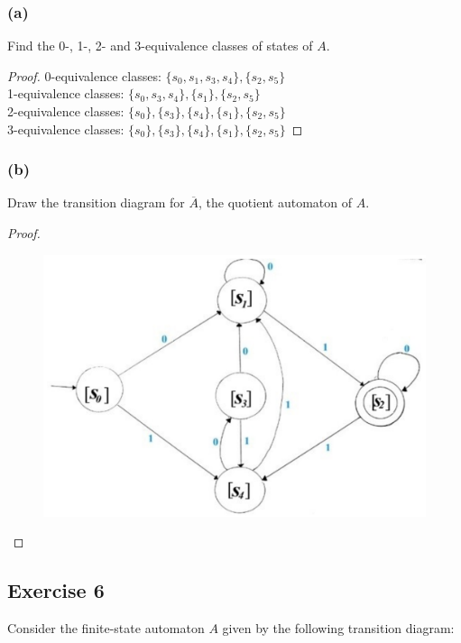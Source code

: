 \documentclass[14pt]{extarticle}
\begin{document}
\subsubsection{(a)}
Find the 0-, 1-, 2- and 3-equivalence classes of states of \(A\).

\begin{proof}
0-equivalence classes: \(\{s_0, s_1, s_3, s_4\}, \{s_2, s_5\}\) \\
1-equivalence classes: \(\{s_0, s_3, s_4\}, \{s_1\}, \{s_2, s_5\}\) \\
2-equivalence classes: \(\{s_0\}, \{s_3\}, \{s_4\}, \{s_1\}, \{s_2, s_5\}\) \\
3-equivalence classes: \(\{s_0\}, \{s_3\}, \{s_4\}, \{s_1\}, \{s_2, s_5\}\)
\end{proof}

\subsubsection{(b)}
Draw the transition diagram for \(\overline{A}\), the quotient automaton of \(A\).

\begin{proof}
\begin{figure}[ht!]
\centering
\includegraphics[scale=0.3]{../images/12.3.5.b.png}
\end{figure}
\end{proof}

\subsection{Exercise 6}
Consider the finite-state automaton \(A\) given by the following transition diagram:
\end{document}
